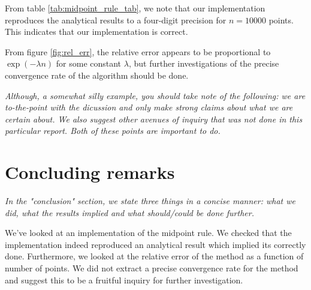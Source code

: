 \documentclass[english,notitlepage, reprint]{revtex4-1}  %
\begin{document}
	From table \ref{tab:midpoint_rule_tab}, we note that our implementation reproduces the analytical results to a four-digit precision for $n = 10000$ points. This indicates that our implementation is correct.
	
	From figure \ref{fig:rel_err}, the relative error appears to be proportional to $\exp(-\lambda n)$ for some constant $\lambda$, but further investigations of the precise convergence rate of the algorithm should be done.
	
	\textit{Although, a somewhat silly example, you should take note of the following: we are to-the-point with the dicussion and only make strong claims about what we are certain about. We also suggest other avenues of inquiry that was not done in this particular report. Both of these points are important to do. }
	
	\section{Concluding remarks}
	\textit{In the "conclusion" section, we state three things in a concise manner: what we did, what the results implied and what should/could be done further.} 
	
	We've looked at an implementation of the midpoint rule. We checked that the implementation indeed reproduced an analytical result which implied its correctly done. Furthermore, we looked at the relative error of the method as a function of number of points. We did not extract a precise convergence rate for the method and suggest this to be a fruitful inquiry for further investigation.
	\onecolumngrid
	
	
	
\end{document}
